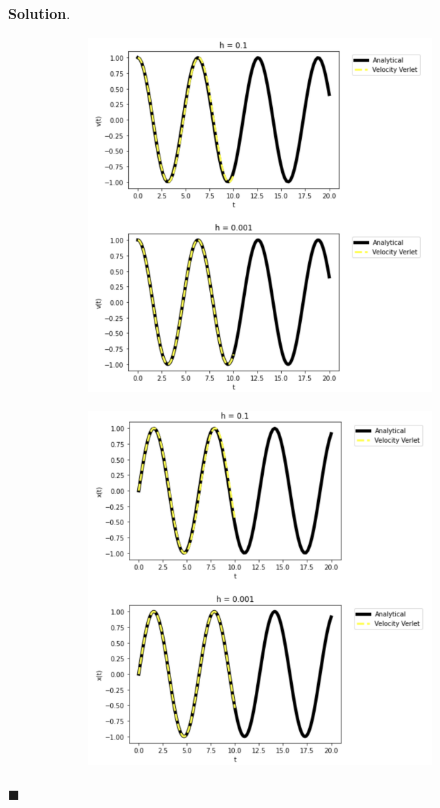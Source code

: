 \documentclass[12pt]{article}
\renewcommand{\=}[1]{\stackrel{#1}{=}} %
\theoremstyle{definition}
\newenvironment{s}{%
        \begin{trivlist} \item \textbf{Solution}. }{%
            \hspace*{\fill} $\blacksquare$\end{trivlist}}%
\begin{document}
\begin{s}
\begin{figure}
\begin{subfigure}{.5\textwidth}
  \includegraphics[width=.9\linewidth]{pic5.png}
  \caption{}
  \label{fig:sub2}
\end{subfigure}
\begin{subfigure}{.5\textwidth}
  \centering
  \includegraphics[width=.9\linewidth]{pic6.png}
  \caption{}
  \label{fig:sub3}
\end{subfigure}

\end{figure}
\end{s}
\end{document}
